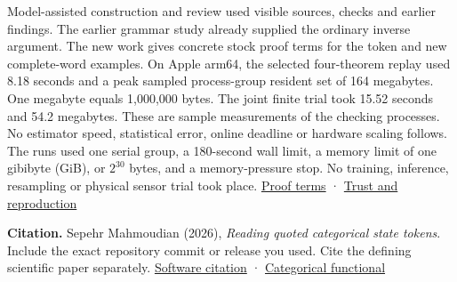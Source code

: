 Model-assisted construction and review used visible sources, checks and earlier findings. The earlier grammar study already supplied the ordinary inverse argument. The new work gives concrete stock proof terms for the token and new complete-word examples. On Apple arm64, the selected four-theorem replay used 8.18 seconds and a peak sampled process-group resident set of 164 megabytes. One megabyte equals 1,000,000 bytes. The joint finite trial took 15.52 seconds and 54.2 megabytes. These are sample measurements of the checking processes. No estimator speed, statistical error, online deadline or hardware scaling follows. The runs used one serial group, a 180-second wall limit, a memory limit of one gibibyte (GiB), or \(2^{30}\) bytes, and a memory-pressure stop. No training, inference, resampling or physical sensor trial took place. \href{https://github.com/sepahead/pid-rs/blob/main/audit/research/categorical-state-token/proof-terms.txt}{Proof terms} · \href{https://github.com/sepahead/pid-rs/blob/main/audit/research/categorical-state-token/EVIDENCE.md}{Trust and reproduction}

\textbf{Citation.} Sepehr Mahmoudian (2026), \emph{Reading quoted categorical state tokens}. Include the exact repository commit or release you used. Cite the defining scientific paper separately. \href{https://github.com/sepahead/pid-rs/blob/main/CITATION.cff}{Software citation} · \href{https://doi.org/10.1103/PhysRevE.103.032149}{Categorical functional}

